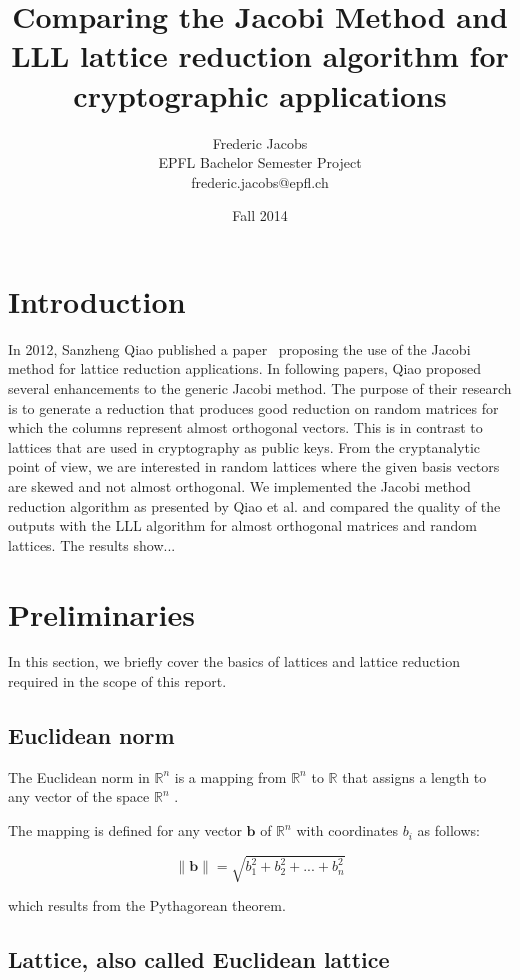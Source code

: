 \documentclass[10pt, a4paper]{article}
\title{Comparing the Jacobi Method and LLL lattice reduction algorithm\my{s} for cryptographic applications}
\date{Fall 2014}
\author{Frederic Jacobs\\ EPFL Bachelor Semester Project\\ frederic.jacobs@epfl.ch}
\newcommand{\my}[1]{{\color{blue} #1 }}
\renewcommand{\vec}[1]{\mathbf{#1}}
\begin{document}
\maketitle

\section{Introduction}
In 2012, Sanzheng Qiao published a paper~\cite{originalJacobiMethodLatticeBasisReduction} proposing the use of the Jacobi method for lattice reduction applications. In following papers, Qiao proposed several enhancements to the generic Jacobi method. \my{The purpose of their research is to generate a reduction that produces good reduction on random matrices for which the columns represent almost orthogonal vectors. This is in contrast to lattices that are used in cryptography as public keys. From the cryptanalytic point of view, we are interested in random lattices where the given basis vectors are skewed and not almost orthogonal.} We implemented the Jacobi method reduction algorithm \my{as presented by Qiao et al. and compared the quality of the outputs with the LLL algorithm for almost orthogonal matrices and random lattices. The results show...}
 
\section{Preliminaries}

In this section, we briefly cover the basics of lattices and lattice reduction required in the scope of this report.

\subsection{Euclidean norm}

The Euclidean norm in $\mathbb{R}^n$ is a mapping from $\mathbb{R}^n $ \my{to} $\mathbb{R}$ that assigns \my{a} length to any vector of the space \my{$\mathbb{R}^n$}.

The mapping is defined for any vector $\vec{b}$ of $\mathbb{R}^n$ with coordinates $b_i$ as follows: 

\[
\|\mathbf{b}\| = \sqrt{b_1^2 + b_2^2 + ... + b_n^2} 
\] 

which results from the Pythagorean theorem.

\subsection{Lattice, also called Euclidean lattice}
\end{document}
